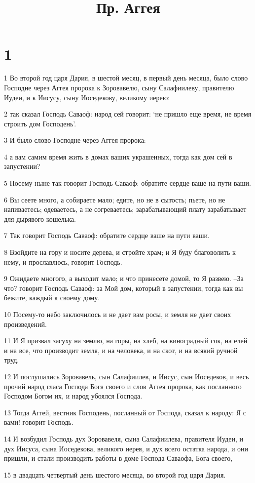 

\title{Пр. Аггея}


\chapter{1}

\par 1 Во второй год царя Дария, в шестой месяц, в первый день месяца, было слово Господне через Аггея пророка к Зоровавелю, сыну Салафиилеву, правителю Иудеи, и к Иисусу, сыну Иоседекову, великому иерею:
\par 2 так сказал Господь Саваоф: народ сей говорит: `не пришло еще время, не время строить дом Господень'.
\par 3 И было слово Господне через Аггея пророка:
\par 4 а вам самим время жить в домах ваших украшенных, тогда как дом сей в запустении?
\par 5 Посему ныне так говорит Господь Саваоф: обратите сердце ваше на пути ваши.
\par 6 Вы сеете много, а собираете мало; едите, но не в сытость; пьете, но не напиваетесь; одеваетесь, а не согреваетесь; зарабатывающий плату зарабатывает для дырявого кошелька.
\par 7 Так говорит Господь Саваоф: обратите сердце ваше на пути ваши.
\par 8 Взойдите на гору и носите дерева, и стройте храм; и Я буду благоволить к нему, и прославлюсь, говорит Господь.
\par 9 Ожидаете многого, а выходит мало; и что принесете домой, то Я развею. --За что? говорит Господь Саваоф: за Мой дом, который в запустении, тогда как вы бежите, каждый к своему дому.
\par 10 Посему-то небо заключилось и не дает вам росы, и земля не дает своих произведений.
\par 11 И Я призвал засуху на землю, на горы, на хлеб, на виноградный сок, на елей и на все, что производит земля, и на человека, и на скот, и на всякий ручной труд.
\par 12 И послушались Зоровавель, сын Салафиилев, и Иисус, сын Иоседеков, и весь прочий народ гласа Господа Бога своего и слов Аггея пророка, как посланного Господом Богом их, и народ убоялся Господа.
\par 13 Тогда Аггей, вестник Господень, посланный от Господа, сказал к народу: Я с вами! говорит Господь.
\par 14 И возбудил Господь дух Зоровавеля, сына Салафиилева, правителя Иудеи, и дух Иисуса, сына Иоседекова, великого иерея, и дух всего остатка народа, и они пришли, и стали производить работы в доме Господа Саваофа, Бога своего,
\par 15 в двадцать четвертый день шестого месяца, во второй год царя Дария.

